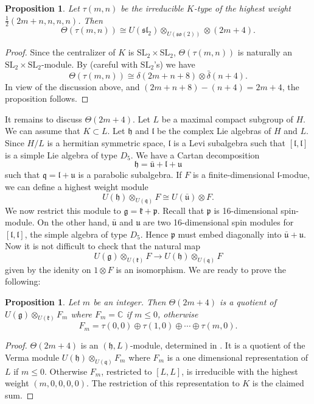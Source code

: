 \documentclass[11pt]{amsart}
\theoremstyle{plain}
\newtheorem{prop}[equation]{Proposition}
\numberwithin{equation}{section}
\newcommand{\SL}{{\mathrm{SL}}}
\begin{document}
\begin{prop} \label{P:1}
Let $\tau(m,n)$ be the irreducible $K$-type of the highest weight $\frac{1}{2}( 2m+n,n,n,n)$.  Then 
\[ 
\Theta(\tau(m,n))\cong U(\mathfrak{sl}_2) \otimes_{U(\mathfrak{so}(2))} \otimes ( 2m+4). 
\] 
\end{prop} 
\begin{proof} Since the centralizer of $K$ is $\SL_2 \times \SL_2$, $\Theta(\tau(m,n))$ is naturally an $\SL_2 \times \SL_2$-module. 
By \cite[Proposition 3.3.3]{Shan} (careful with $\SL_2$'s) we have 
\[ 
\Theta(\tau(m,n))\cong \delta(2m+n+8)  \otimes \bar{\delta}(n+4). 
\] 
In view of the discussion above,  and $(2m+n+8)-(n+4)=2m+4$, the proposition follows. 

\end{proof} 

It remains to discuss $\Theta(2m+4)$. Let $L$ be a maximal compact subgroup of $H$. We can assume that $K\subset L$. Let $\mathfrak h$ and $\mathfrak l$ be the 
complex Lie algebras of $H$ and $L$.  Since $H/L$ is a hermitian symmetric space,  $\mathfrak l$ is a Levi subalgebra such that $[\mathfrak l, \mathfrak l]$ is a simple Lie algebra of type $D_5$. 
We have a Cartan decomposition 
\[ 
\mathfrak h = \bar{\mathfrak u} + \mathfrak l + \mathfrak u
\] 
such that $\mathfrak q= \mathfrak l + \mathfrak u$ is a parabolic subalgebra. If $F$ is a finite-dimensional $\mathfrak l$-modue, we can define a highest weight module 
\[ 
U(\mathfrak h) \otimes_{U(\mathfrak q)} F \cong U(\bar{\mathfrak u}) \otimes F. 
\] 
We now restrict this module to $\mathfrak g=\mathfrak k + \mathfrak p$. Recall that $\mathfrak p$ is 16-dimensional spin-module. On the other hand, $\bar{\mathfrak u}$ and $\mathfrak u$ 
are two 16-dimensional spin modules for $[\mathfrak l, \mathfrak l]$, the simple algebra of type $D_5$. Hence  $\mathfrak p$ must embed diagonally into $\bar{\mathfrak u} + \mathfrak u$. 
Now it is not difficult to check that the natural map 
\[ 
U(\mathfrak g) \otimes_{U(\mathfrak k)} F \rightarrow U(\mathfrak h) \otimes_{U(\mathfrak q)} F
\] 
given by the idenity on $1\otimes F$ is an isomorphism.  We are ready to prove the following: 

\begin{prop} \label{P:2}
Let $m$ be an integer. Then $\Theta(2m+4)$ is a quotient of $U(\mathfrak g)\otimes_{U(\mathfrak k)} F_m$  where 
$F_m=\mathbb C$ if $m\leq 0$, otherwise 
\[ 
F_m=\tau(0,0) \oplus \tau(1,0) \oplus \cdots \oplus \tau(m,0). 
\] 
\end{prop} 
\begin{proof}  $\Theta(2m+4)$ is an $(\mathfrak h, L)$-module, determined in \cite[Section 6]{Pavle}. It is a quotient of the Verma module $U(\mathfrak h) \otimes_{U(\mathfrak q)} F_m$ 
where $F_m$ is a one dimensional representation of $L$ if $m\leq 0$. Otherwise $F_m$, restricted to $[L,L]$, is irreducible with the 
highest weight $(m,0,0,0,0)$.  The restriction of this representation to $K$ is the claimed sum. 
\end{proof} 
\end{document}
